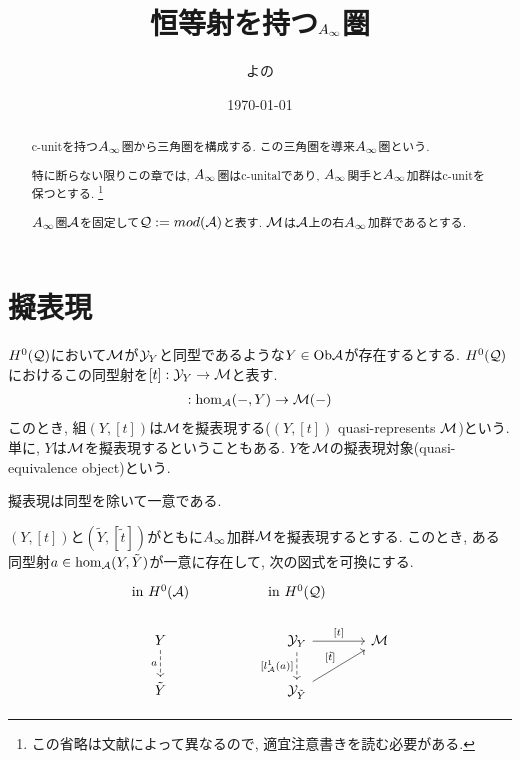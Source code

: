 \documentclass[uplatex, a4paper, 14Q, dvipdfmx]{jsarticle}
\title{恒等射を持つ\texorpdfstring{$A_{\infty}$}{Ainf}圏}
\author{よの}
\date{\today}
\begin{document}
\maketitle

\begin{abstract}
  c-unitを持つ$A_{\infty}$圏から三角圏を構成する. 
  この三角圏を導来$A_{\infty}$圏という. 

  特に断らない限りこの章では, $A_{\infty}$圏はc-unitalであり, $A_{\infty}$関手と$A_{\infty}$加群はc-unitを保つとする.
  \footnote{
    この省略は文献によって異なるので, 適宜注意書きを読む必要がある. 
  }

  $A_{\infty}$圏$\mathcal{A}$を固定して$\mathcal{Q} := mod (\mathcal{A})$と表す. 
  $\mathcal{M}$は$\mathcal{A}$上の右$A_{\infty}$加群であるとする. 
\end{abstract}

\tableofcontents

\section{擬表現}

\begin{definition}[擬表現]
  $H^0(\mathcal{Q})$において$\mathcal{M}$が$\mathcal{Y}_Y$と同型であるような$Y \in \mathrm{Ob}\mathcal{A}$が存在するとする.  
  $H^0(\mathcal{Q})$におけるこの同型射を$[t] : \mathcal{Y}_Y \to \mathcal{M}$と表す. 
  \begin{align*}
    [t] : \hom_\A(-,Y) \to \M(-)
  \end{align*}
  このとき, 組$(Y,[t])$は$\mathcal{M}$を擬表現する($(Y,[t])$ quasi-represents $\mathcal{M}$)という. 
  単に, $Y$は$\mathcal{M}$を擬表現するということもある.
  $Y$を$\mathcal{M}$の擬表現対象(quasi-equivalence object)という. 
\end{definition}

擬表現は同型を除いて一意である. 

\begin{lemma}
  $(Y,[t])$と$(\tilde{Y}, [\tilde{t}])$がともに$A_{\infty}$加群$\mathcal{M}$を擬表現するとする.
  このとき, ある同型射$a \in \hom_{\mathcal{A}}(Y,\tilde{Y})$が一意に存在して, 次の図式を可換にする. 
  \[\begin{tikzcd}
    {\mathrm{in} ~ H^0(\A)} && {\mathrm{in} ~ H^0(\Q)} \\
    Y && {\Y_Y} & \M \\
    {\tilde{Y}} && {\Y_{\tilde{Y}}}
    \arrow["a"', dashed, from=2-1, to=3-1]
    \arrow["{[l_\A^1(a)]}"', dashed, from=2-3, to=3-3]
    \arrow["{[t]}", from=2-3, to=2-4]
    \arrow["{[\tilde{t}]}", from=3-3, to=2-4]
  \end{tikzcd}\]
\end{lemma}
\end{document}
